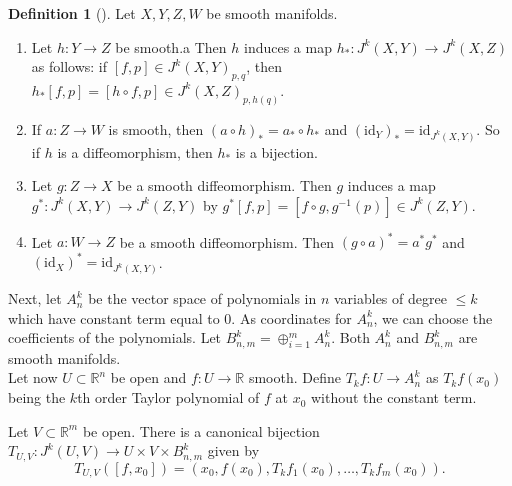 \documentclass[reqno]{amsart}
\theoremstyle{definition}
\newtheorem{definition}[theorem]{Definition}
\theoremstyle{remark}
\newcommand{\id}{{\mathrm{id}}}
\begin{document}
\begin{definition}[]
    Let $X,Y,Z,W$ be smooth manifolds.
    \begin{enumerate}
        \item Let $h \colon Y \to Z$ be smooth.a
            Then $h$ induces a map
            $h_* \colon J^{k}(X,Y) \to
            J^{k}(X,Z)$ as follows:
            if $\left[ f,p \right]  \in J^{k}(X,Y)_{p,q}$, then
            $h_* \left[ f,p \right] =
            \left[ h \circ f, p \right]
            \in J^{k}\left( X,Z \right)_{p,h(q)}$.
        \item If $a \colon Z \to W$ is smooth, then
            $\left( a \circ h \right)_{*}
            = a_* \circ h_*$ and
            $\left( \id_Y \right)_* =
            \id_{J^{k}(X,Y)}$. So if
            $h$ is a diffeomorphism, then
            $h_*$ is a bijection.
        \item Let $g \colon Z \to X$ be a smooth
            diffeomorphism. Then
            $g$ induces a map
            $g^{*} \colon J^{k}(X,Y) \to
            J^{k}(Z,Y)$ by
            $g^{*}\left[ f,p \right] =
            \left[ f \circ g, g^{-1}(p) \right]
            \in J^k (Z,Y)$.
            \item Let $a \colon W \to Z$ be a smooth diffeomorphism.
            Then $\left( g \circ a \right)^{*}=
            a^{*} g^{*}$ and
            $\left( \id_X \right)^{*} =
            \id_{J^{k}(X,Y)}$.
    \end{enumerate}
\end{definition}



Next, let
$A_n^{k}$ be the vector space of polynomials in $n$ variables
of degree $\le k$ which have constant term equal to $0$.
As coordinates for $A_n^{k}$, we can choose the
coefficients of the polynomials.
Let $B_{n,m}^{k} = \oplus_{i=1}^{m} A_n^{k}$.
Both $A_{n}^{k}$ and
$B_{n,m}^{k}$ are smooth manifolds.\\

Let now $U \subset \mathbb{R}^{n}$ be open and
$f \colon U \to \mathbb{R}$ smooth. Define
$T_kf \colon U \to A_n^{k}$ as
$T_kf(x_0)$ being
the $k$th order Taylor polynomial of $f$ at $x_0$ without the
constant term.

Let $V \subset \mathbb{R}^{m}$ be open. There is a canonical
bijection
$T_{U,V} \colon
J^{k}(U,V) \to U \times V \times B_{n,m}^{k}$ given by
\[
T_{U,V} \left( \left[ f,x_0 \right]  \right)
= \left( x_0, f(x_0), T_{k}f_1 (x_0),
\ldots, T_kf_m (x_0) \right) .
\]
\end{document}
